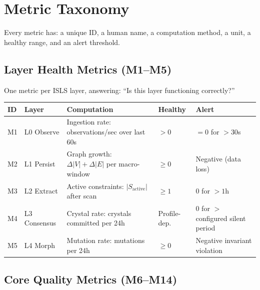 \documentclass[10pt,a4paper]{article}
\begin{document}
\section{Metric Taxonomy}
\label{sec:metrics}

Every metric has: a unique ID, a human name, a computation method, a unit, a healthy range, and an alert threshold.

\subsection{Layer Health Metrics (M1--M5)}

One metric per ISLS layer, answering: ``Is this layer functioning correctly?''

\begin{longtable}{l l p{4.8cm} l l}
\toprule \textbf{ID} & \textbf{Layer} & \textbf{Computation} & \textbf{Healthy} & \textbf{Alert} \\
\midrule\endhead
M1 & L0 Observe & Ingestion rate: observations/sec over last 60s & $>0$ & $=0$ for $>30$s \\
M2 & L1 Persist & Graph growth: $\Delta|V| + \Delta|E|$ per macro-window & $\geq 0$ & Negative (data loss) \\
M3 & L2 Extract & Active constraints: $|S_{\text{active}}|$ after scan & $\geq 1$ & $0$ for $>1$h \\
M4 & L3 Consensus & Crystal rate: crystals committed per 24h & Profile-dep. & $0$ for $>$ configured silent period \\
M5 & L4 Morph & Mutation rate: mutations per 24h & $\geq 0$ & Negative invariant violation \\
\bottomrule
\end{longtable}

\subsection{Core Quality Metrics (M6--M14)}
\end{document}
